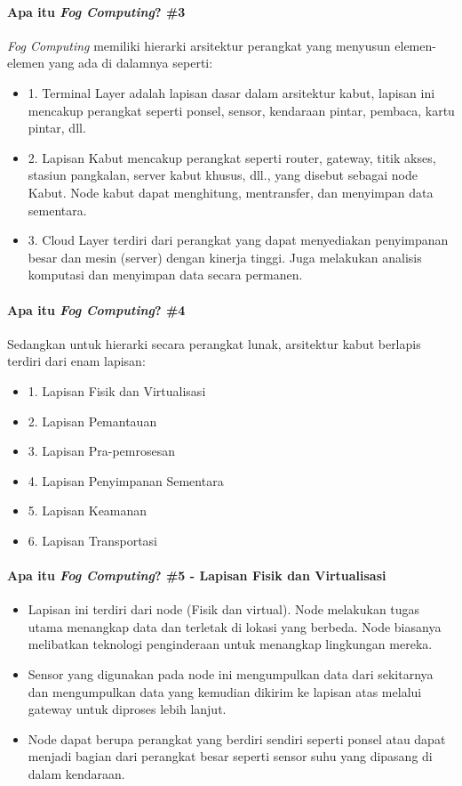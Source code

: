 \begin{frame}{\insertsectionhead}
	\framesubtitle{Apa itu \textit{Fog Computing}? \#3}
	\justifying
	\textit{Fog Computing} memiliki hierarki arsitektur perangkat yang menyusun elemen-elemen yang ada di dalamnya seperti:
	\vfill
	\begin{itemize}
		\item 1. Terminal Layer adalah lapisan dasar dalam arsitektur kabut, lapisan ini mencakup perangkat seperti ponsel, sensor, kendaraan pintar, pembaca, kartu pintar, dll.
		\item 2. Lapisan Kabut mencakup perangkat seperti router, gateway, titik akses, stasiun pangkalan, server kabut khusus, dll., yang disebut sebagai node Kabut. Node kabut dapat menghitung, mentransfer, dan menyimpan data sementara.
		\item 3. Cloud Layer terdiri dari perangkat yang dapat menyediakan penyimpanan besar dan mesin (server) dengan kinerja tinggi. Juga melakukan analisis komputasi dan menyimpan data secara permanen.
	\end{itemize}
\end{frame}

\begin{frame}{\insertsectionhead}
	\framesubtitle{Apa itu \textit{Fog Computing}? \#4}
	\justifying
	Sedangkan untuk hierarki secara perangkat lunak, arsitektur kabut berlapis terdiri dari enam lapisan:
	\vfill
	\begin{itemize}
		\item 1. Lapisan Fisik dan Virtualisasi
		\item 2. Lapisan Pemantauan
		\item 3. Lapisan Pra-pemrosesan
		\item 4. Lapisan Penyimpanan Sementara
		\item 5. Lapisan Keamanan
		\item 6. Lapisan Transportasi
	\end{itemize}
\end{frame}

\begin{frame}{\insertsectionhead}
	\framesubtitle{Apa itu \textit{Fog Computing}? \#5 - Lapisan Fisik dan Virtualisasi}
	\justifying
	\begin{itemize}
		\item Lapisan ini terdiri dari node (Fisik dan virtual). Node melakukan tugas utama menangkap data dan terletak di lokasi yang berbeda. Node biasanya melibatkan teknologi penginderaan untuk menangkap lingkungan mereka.
		\item Sensor yang digunakan pada node ini mengumpulkan data dari sekitarnya dan mengumpulkan data yang kemudian dikirim ke lapisan atas melalui gateway untuk diproses lebih lanjut.
		\item Node dapat berupa perangkat yang berdiri sendiri seperti ponsel atau dapat menjadi bagian dari perangkat besar seperti sensor suhu yang dipasang di dalam kendaraan.
	\end{itemize}
\end{frame}

